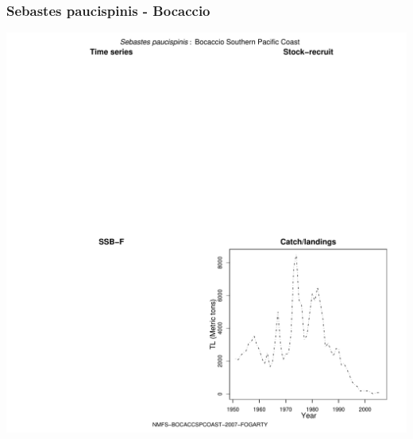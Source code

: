 \subsubsection{Sebastes paucispinis - Bocaccio}
\begin{center}
\includegraphics[width=1.2\textwidth]{../R/figures/NMFS-BOCACCSPCOAST-2007-FOGARTY.pdf}
\end{center}

